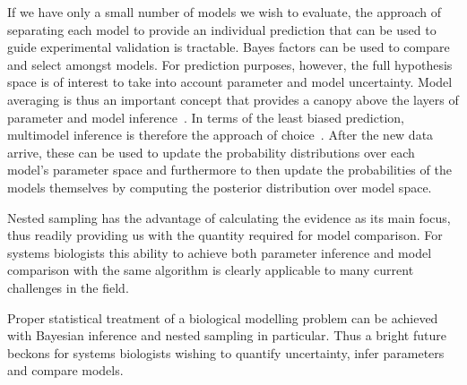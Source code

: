 If we have only a small number of models we wish to evaluate, the approach of separating each model to provide an individual prediction that can be used to guide experimental validation is tractable.
Bayes factors can be used to compare and select amongst models.
For prediction purposes, however, the full hypothesis space is of interest to take into account parameter and model uncertainty.
Model averaging is thus an important concept that provides a canopy above the layers of parameter and model inference~\cite{mackay2003, burnham2002}. 
In terms of the least biased prediction, multimodel inference is therefore the approach of choice~\cite{mackay2003, posada2004, burnham2002, link2006}.
After the new data arrive, these can be used to update the probability distributions over each model's parameter space and furthermore to then update the probabilities of the models themselves by computing the posterior distribution over model space.

Nested sampling has the advantage of calculating the evidence as its main focus, thus readily providing us with the quantity required for model comparison.
For systems biologists this ability to achieve both parameter inference and model comparison with the same algorithm is clearly applicable to many current challenges in the field.

Proper statistical treatment of a biological modelling problem can be achieved with Bayesian inference and nested sampling in particular.
Thus a bright future beckons for systems biologists wishing to quantify uncertainty, infer parameters and compare models.
